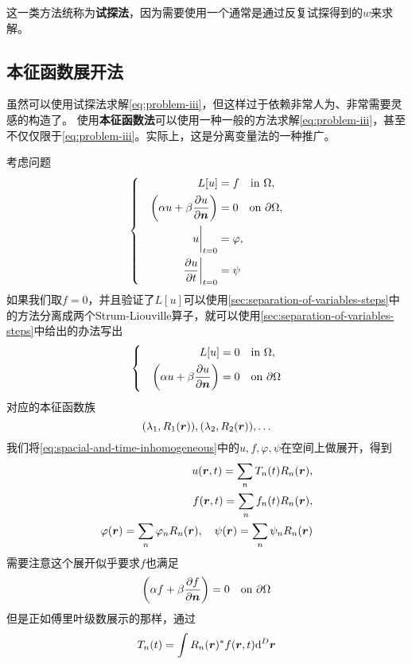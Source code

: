 \documentclass[UTF8]{ctexart}
\newenvironment{bigcase}{\left\{ \quad \begin{aligned}}{\end{aligned}\right.}
\begin{document}
这一类方法统称为\textbf{试探法}，因为需要使用一个通常是通过反复试探得到的$w$来求解。

\subsection{本征函数展开法}\label{sec:eigenfunction-expanding}

虽然可以使用试探法求解\eqref{eq:problem-iii}，但这样过于依赖非常人为、非常需要灵感的构造了。
使用\textbf{本征函数法}可以使用一种一般的方法求解\eqref{eq:problem-iii}，甚至不仅仅限于\eqref{eq:problem-iii}。实际上，这是分离变量法的一种推广。

考虑问题
\begin{equation}
    \begin{bigcase}
        L[u] &= f \quad \text{in $\Omega$}, \\
        \left(\alpha u + \beta \pdv{u}{\vb*{n}} \right) &= 0 \quad \text{on $\partial \Omega$}, \\
        \eval{u}_{t=0} &= \varphi, \\
        \eval{\pdv{u}{t}}_{t=0} &= \psi
    \end{bigcase}
    \label{eq:spacial-and-time-inhomogeneous}
\end{equation}
如果我们取$f=0$，并且验证了$L[u]$可以使用\ref{sec:separation-of-variables-steps}中的方法分离成两个Strum-Liouville算子，就可以使用\ref{sec:separation-of-variables-steps}中给出的办法写出
\[
    \begin{bigcase}
        L[u] &= 0 \quad \text{in $\Omega$}, \\
        \left(\alpha u + \beta \pdv{u}{\vb*{n}} \right) &= 0 \quad \text{on $\partial \Omega$}
    \end{bigcase}
\]
对应的本征函数族
\[
    (\lambda_1, R_1(\vb*{r})), (\lambda_2, R_2(\vb*{r})), \ldots
\]
我们将\eqref{eq:spacial-and-time-inhomogeneous}中的$u, f, \varphi, \psi$在空间上做展开，得到
\[
    \begin{split}
        u(\vb*{r}, t) = \sum_n T_n(t) R_n(\vb*{r}), \\
        f(\vb*{r}, t) = \sum_n f_n(t) R_n(\vb*{r}), \\
        \varphi(\vb*{r}) = \sum_n \varphi_n R_n(\vb*{r}), \quad \psi(\vb*{r}) = \sum_n \psi_n R_n(\vb*{r})
    \end{split}
\]
需要注意这个展开似乎要求$f$也满足
\[
    \left(\alpha f + \beta \pdv{f}{\vb*{n}} \right) = 0 \quad \text{on $\partial \Omega$}
\]
但是正如傅里叶级数展示的那样，通过
\[
    T_n(t) = \int R_n(\vb*{r})^* f(\vb*{r}, t) \dd^D \vb*{r}
\]
\end{document}
